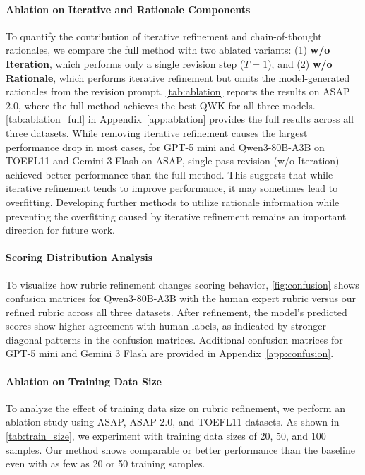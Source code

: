 \documentclass[11pt]{article}
\begin{document}
\paragraph{Ablation on Iterative and Rationale Components}
To quantify the contribution of iterative refinement and chain-of-thought rationales, we compare the full method with two ablated variants: (1) \textbf{w/o Iteration}, which performs only a single revision step ($T=1$), and (2) \textbf{w/o Rationale}, which performs iterative refinement but omits the model-generated rationales from the revision prompt. \autoref{tab:ablation} reports the results on ASAP 2.0, where the full method achieves the best QWK for all three models. \autoref{tab:ablation_full} in Appendix~\ref{app:ablation} provides the full results across all three datasets. 
While removing iterative refinement causes the largest performance drop in most cases, for GPT-5 mini and Qwen3-80B-A3B on TOEFL11 and Gemini 3 Flash on ASAP, single-pass revision (w/o Iteration) achieved better performance than the full method. This suggests that while iterative refinement tends to improve performance, it may sometimes lead to overfitting. Developing further methods to utilize rationale information while preventing the overfitting caused by iterative refinement remains an important direction for future work.


\paragraph{Scoring Distribution Analysis}
To visualize how rubric refinement changes scoring behavior, \autoref{fig:confusion} shows confusion matrices for Qwen3-80B-A3B with the human expert rubric versus our refined rubric across all three datasets. After refinement, the model's predicted scores show higher agreement with human labels, as indicated by stronger diagonal patterns in the confusion matrices. Additional confusion matrices for GPT-5 mini and Gemini 3 Flash are provided in Appendix~\ref{app:confusion}.

\paragraph{Ablation on Training Data Size}
To analyze the effect of training data size on rubric refinement, we perform an ablation study using ASAP, ASAP 2.0, and TOEFL11 datasets. As shown in \autoref{tab:train_size}, we experiment with training data sizes of 20, 50, and 100 samples. Our method shows comparable or better performance than the baseline even with as few as 20 or 50 training samples.
\end{document}
